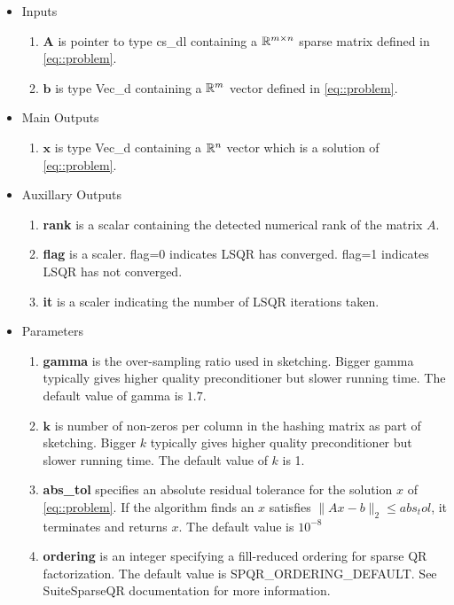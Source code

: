 \documentclass[english,11pt]{article}
\begin{document}
	\begin{itemize}
	\setlength\itemsep{-0.5em}
	\item Inputs 
		\begin{enumerate}
			\item $\mathbf A$ is pointer to type cs_dl containing a $\mathbb{R}^{m\times n}$ sparse matrix defined in \eqref{eq::problem}.
			\item $\mathbf b$ is type Vec_d containing a $\mathbb{R}^m$ vector defined in \eqref{eq::problem}.
		\end{enumerate}
	
	\item Main Outputs
		\begin{enumerate}
			\item {$\mathbf x$} is type Vec_d containing a $\mathbb{R}^n$ vector which is a solution of \eqref{eq::problem}.
		\end{enumerate}

	\item Auxillary Outputs
		\begin{enumerate}
			\item {\bf rank} is a scalar containing the detected numerical rank of the matrix $A$. 
			\item {\bf flag} is a scaler. flag=0 indicates LSQR has converged. flag=1 indicates LSQR has not converged. 
			\item {\bf it} is a scaler indicating the number of LSQR iterations taken. 
		\end{enumerate}
		

	\item Parameters
		\begin{enumerate}
			\item {\bf gamma} is the over-sampling ratio used in sketching. Bigger gamma typically gives higher quality preconditioner but slower running time. The default value of gamma is $1.7$.

			\item $\mathbf k$ is number of non-zeros per column in the hashing matrix as part of sketching. Bigger $k$ typically gives higher quality preconditioner but slower running time. The default value of $k$ is 1. 

			\item {\bf abs_tol} specifies an absolute residual tolerance for the solution $x$ of \ref{eq::problem}. If the algorithm finds an $x$ satisfies $\|Ax-b\|_2 \leq abs_tol$, it terminates and returns $x$. The default value is $10^{-8}$

			\item {\bf ordering} is an integer specifying a fill-reduced ordering for sparse QR factorization. The default value is {SPQR_ORDERING_DEFAULT}. See SuiteSparseQR documentation for more information. 


\end{enumerate}
\end{itemize}
\end{document}
